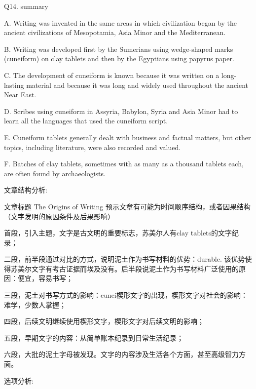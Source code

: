 \begin{blk}
    \begin{qst}
        Q14. summary
    \end{qst}

    \begin{chc}
        A. Writing was invented in the same areas in which civilization began by the ancient civilizations of Mesopotamia, Asia Minor and the Mediterranean.

        B. Writing was developed first by the Sumerians using wedge-shaped marks (cuneiform) on clay tablets and then by the Egyptians using papyrus paper.

        C. The development of cuneiform is known because it was written on a long-lasting material and because it was long and widely used throughout the ancient Near East.

        D. Scribes using cuneiform in Assyria, Babylon, Syria and Asia Minor had to learn all the languages that used the cuneiform script.

        E. Cuneiform tablets generally dealt with business and factual matters, but other topics, including literature, were also recorded and valued.

        F. Batches of clay tablets, sometimes with as many as a thousand tablets each, are often found by archaeologists.
    \end{chc}

    \begin{nlz}
        文章结构分析:

        文章标题 The Origins of Writing 预示文章有可能为时间顺序结构，或者因果结构（文字发明的原因条件及后果影响）

        首段，引入主题，文字是古文明的重要标志，苏美尔人有clay tablets的文字纪录；

        二段，前半段通过对比的方式，说明泥土作为书写材料的优势：durable. 该优势使得苏美尔文字有考古证据而埃及没有。后半段说泥土作为书写材料广泛使用的原因：便宜，容易书写；

        三段，泥土对书写方式的影响：cunei楔形文字的出现，楔形文字对社会的影响：难学，少数人掌握；

        四段，后续文明继续使用楔形文字，楔形文字对后续文明的影响；

        五段，早期文字的内容：从简单账本纪录到日常生活纪录；

        六段，大批的泥土字母被发现。文字的内容涉及生活各个方面，甚至高级智力方面。

        选项分析:


\end{nlz}
\end{blk}
